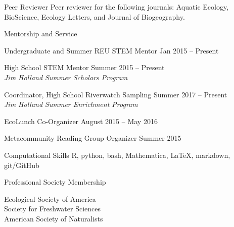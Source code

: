 \documentclass{resume} %
\begin{document}
\begin{rSection}{Peer Reviewer}
Peer reviewer for the following journals: Aquatic Ecology, BioScience, Ecology Letters, and Journal of Biogeography.
\end{rSection}
\bigskip

\begin{rSection}{Mentorship and Service}

{Undergraduate and Summer REU STEM Mentor} \hfill Jan 2015 -- Present


{High School STEM Mentor} \hfill Summer 2015 -- Present\\
{\em Jim Holland Summer Scholars Program}
 

{Coordinator, High School Riverwatch Sampling} \hfill Summer 2017 -- Present\\
{\em Jim Holland Summer Enrichment Program}

{EcoLunch Co-Organizer} \hfill August 2015 -- May 2016

{Metacommunity Reading Group Organizer} \hfill Summer 2015

\end{rSection}

\bigskip

\begin{rSection}{Computational Skills}
R, python, bash, Mathematica, \LaTeX, markdown, git/GitHub 

\end{rSection}

\bigskip

\begin{rSection}{Professional Society Membership}

Ecological Society of America\\
Society for Freshwater Sciences\\
American Society of Naturalists\\ 

\end{rSection}
\end{document}
